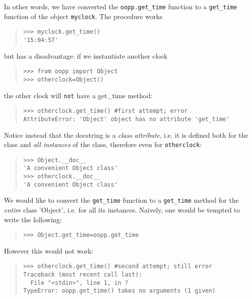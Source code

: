 \documentclass[10pt,english]{article}
\begin{document}
In other words, we have converted the \texttt{oopp.get{\_}time} function to a
\texttt{get{\_}time} function of the object \texttt{myclock}. The procedure works
\begin{quote}
\begin{verbatim}>>> myclock.get_time()
'15:04:57'\end{verbatim}
\end{quote}

but has a disadvantage: if we instantiate another
clock
\begin{quote}
\begin{verbatim}>>> from oopp import Object
>>> otherclock=Object()\end{verbatim}
\end{quote}

the other clock will \texttt{not} have a get{\_}time method:
\begin{quote}
\begin{verbatim}>>> otherclock.get_time() #first attempt; error
AttributeError: 'Object' object has no attribute 'get_time'\end{verbatim}
\end{quote}

Notice instead that the docstring is a \emph{class attribute}, i.e. it
is defined both for the class and \emph{all instances} of the class,
therefore even for \texttt{otherclock}:
\begin{quote}
\begin{verbatim}>>> Object.__doc__
'A convenient Object class' 
>>> otherclock.__doc__
'A convenient Object class'\end{verbatim}
\end{quote}

We would like to convert the \texttt{get{\_}time} function to a 
\texttt{get{\_}time} method for the \emph{entire} class 'Object', i.e. for all its
instances. Naively, one would be tempted to write the following:
\begin{quote}
\begin{verbatim}>>> Object.get_time=oopp.get_time\end{verbatim}
\end{quote}

However this would not work:
\begin{quote}
\begin{verbatim}>>> otherclock.get_time() #second attempt; still error
Traceback (most recent call last):
  File "<stdin>", line 1, in ?
TypeError: oopp.get_time() takes no arguments (1 given)\end{verbatim}
\end{quote}
\end{document}
